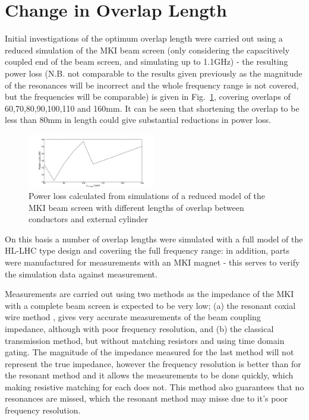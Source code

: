 \documentclass[a4paper,
              ]{jacow}
\begin{document}
\section{Change in Overlap Length}

Initial investigations of the optimum overlap length were carried out using a reduced simulation of the MKI beam screen (only considering the capacitively coupled end of the beam screen, and simulating up to 1.1GHz) - the resulting power loss (N.B. not comparable to the results given previously as the magnitude of the resonances will be incorrect and the whole frequency range is not covered, but the frequencies will be comparable) is given in Fig.~\ref{fig:powLossLowRes}, covering overlaps of 60,70,80,90,100,110 and 160mm. It can be seen that shortening the overlap to be less than 80mm in length could give substantial reductions in power loss.

\begin{figure}
\begin{center}
\includegraphics[width=0.5\textwidth]{MOPJE038f4.pdf}
\caption{Power loss calculated from simulations of a reduced model of the MKI beam screen with different lengths of overlap between conductors and external cylinder}
\label{fig:powLossLowRes}
\end{center}
\end{figure}

On this basis a number of overlap lengths were simulated with a full model of the HL-LHC type design and coveriing the full frequency range: in addition, parts were manufactured for measurements with an MKI magnet - this serves to verify the simulation data against measurement. 

Measurements are carried out using two methods as the impedance of the MKI with a complete beam screen is expected to be very low; (a) the resonant coxial wire method \cite{DayThesis}, gives very accurate measurements of the beam coupling impedance, although with poor frequency resolution, and (b) the classical transmission method, but without matching resistors and using time domain gating. The magnitude of the impedance measured for the last method will not represent the true impedance, however the frequency resolution is better than for the resonant method and it allows the measurements to be done quickly, which making resistive matching for each does not. This  method also guarantees that no resonances are missed, which the resonant method may misse due to it's poor frequency resolution.
\end{document}
